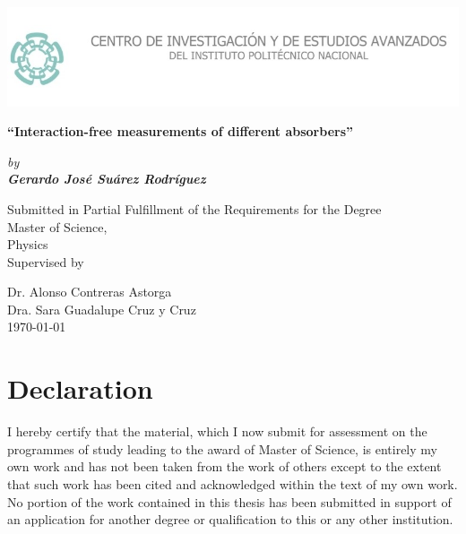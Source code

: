 \documentclass[12pt]{article}
\begin{document}
\newcommand\numberthis{\addtocounter{equation}{1}\tag{\theequation}}
\newcommand\blankpage{%
    \null
    \thispagestyle{empty}%
    \newpage}

\thispagestyle{empty}
\setlength\headheight{0pt} 
\begin{center}

\begin{center}
\includegraphics[width=1\linewidth]{images/logo.jpg}            
\end{center}	

  \vspace{3 cm}

        {\Large\bfseries  ``Interaction-free measurements of different absorbers''\par}
        
        \vspace{0.5cm}
        {\Large\itshape by \\ \bfseries Gerardo José Suárez Rodríguez \par \par}
        

\vspace{2cm}

Submitted in Partial Fulfillment of the Requirements for the Degree \\
Master of Science, \\ Physics\\
Supervised by\par
Dr. Alonso Contreras Astorga  \\
Dra. Sara Guadalupe Cruz y Cruz\\


\vspace{1.5cm}
\large
\today

\end{center}

\clearpage
\restoregeometry
\justify
\tableofcontents
{}
\pagebreak
{}
\section*{Declaration}
I hereby certify that the material, which I now submit for assessment on the programmes of study leading to the award of Master of Science, is entirely my own work and has not been taken from the work of others except to the extent that such work has been cited and acknowledged within the text of my own work. No portion of the work contained in this thesis has been submitted in support of an application for another degree or qualification to this or any other institution.
\end{document}
